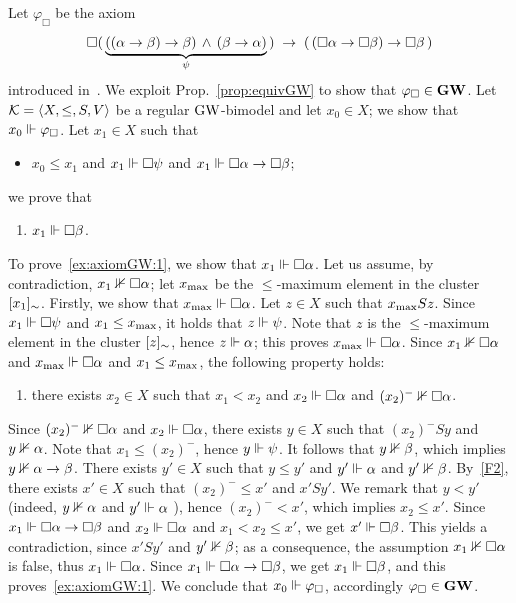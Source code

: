 \begin{example}\label{ex:axiomGW}
  Let $\varphi_\Box$ be the axiom 
  \[
\Box(\, \underbrace{((\alpha\to \beta)\to\beta) \,\land\, (\beta\to\alpha)}_{\psi}  \,) \; \to \; (\,(\Box\alpha \to \Box\beta) \to \Box \beta\,)
  \]
introduced in~\cite{VidalR:26}.
  We exploit Prop.~\ref{prop:equivGW} to show that $\varphi_\Box\in\mathbf{GW}$.
  Let  $\mathcal{K}=\langle X,\leq,S,V \rangle$ be a regular   $\mbox{$\mathrm{GW}$}$-bimodel and let  $x_0\in X$;
  we show that  $x_0\Vdash \varphi_\Box$.
  Let $x_1\in X$ such that
\begin{itemize}
\item $x_0\leq x_1$ and $x_1\Vdash \Box \psi$ and $x_1\Vdash \Box \alpha\to \Box\beta$;
\end{itemize}
we prove that
\begin{enumerate}[label=(\alph*), ref=(\alph*),leftmargin=*]
\item\label{ex:axiomGW:1}
$x_1\Vdash  \Box \beta$.
\end{enumerate}
To prove~\ref{ex:axiomGW:1}, we show that $x_1\Vdash  \Box \alpha$.
Let us assume, by contradiction,  $x_1\nVdash  \Box \alpha$;
let  $x_{\mathrm{max}}$ be the $\leq$-maximum element in the cluster $[x_1]_\sim$.
Firstly, we show that  $x_{\mathrm{max}} \Vdash \Box \alpha$.
Let  $z\in X$ such that $x_{\mathrm{max}} S z$. Since  $x_1\Vdash\Box\psi$ and $x_1\leq x_{\mathrm{max}}$,
it holds that $z\Vdash \psi$.  Note that $z$ is  the $\leq$-maximum element in the cluster $[z]_\sim$,
hence $z\Vdash \alpha$; this proves  $x_{\mathrm{max}} \Vdash \Box \alpha$.
Since   $x_1\nVdash  \Box \alpha$  and   $x_{\mathrm{max}} \Vdash \Box \alpha$ and $x_1\leq x_{\mathrm{max}}$,   the following property holds:
\begin{enumerate}[label=(\alph*), ref=(\alph*),leftmargin=*,start=2]
\item\label{ex:axiomGW:2}
  there exists $x_2\in X$ such that $x_1 < x_2$ and   $x_2\Vdash\Box\alpha$  and $(x_2)^-\nVdash \Box \alpha$.
\end{enumerate}
Since  $(x_2)^-\nVdash \Box \alpha$ and  $x_2\Vdash\Box\alpha$, there exists $y\in X$ such that
$(x_2)^- S y$ and $y\nVdash \alpha$. Note that $x_1\leq (x_2)^-$, hence $y\Vdash \psi$.
It follows that  $y\nVdash\beta$,  which implies $y\nVdash \alpha\to \beta$.
There exists $y'\in X$ such that  $y \leq y'$ and   $y'\Vdash \alpha$ and $y'\nVdash \beta$.
By~\ref{F2}, there exists $x'\in X$ such that $(x_2)^-\leq x'$ and $x' S y'$.
We remark that $y <  y'$ (indeed,  $y\nVdash \alpha$  and $y'\Vdash \alpha$ ), hence   $(x_2)^-< x'$, which implies  $x_2\leq x'$.
Since $x_1\Vdash \Box\alpha\to \Box\beta$ and $x_2\Vdash \Box\alpha$ and  $x_1< x_2\leq x'$, we get $x'\Vdash\Box \beta$.
This yields a contradiction, since $x'S y'$ and $y'\nVdash \beta$;
as a consequence,  the assumption   $x_1\nVdash  \Box \alpha$ is false,
thus   $x_1\Vdash  \Box \alpha$.  Since  $x_1\Vdash \Box \alpha\to \Box\beta$, we get $x_1\Vdash  \Box \beta$,
and this proves~\ref{ex:axiomGW:1}.
We conclude  that   $x_0\Vdash \varphi_\Box$, accordingly
$\varphi_\Box\in\mathbf{GW}$.
\EndEx
\end{example}

